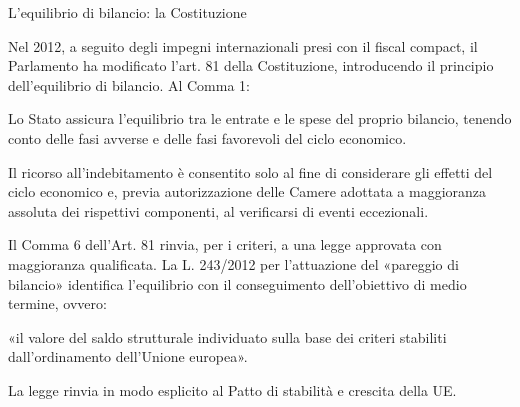 \documentclass[aspectratio=149,11pt,italian]{beamer}
\begin{document}
\begin{frame}{L'equilibrio di bilancio: la Costituzione}
  
  Nel 2012, a seguito degli impegni internazionali presi con il \alert{fiscal
    compact}, il Parlamento ha modificato l'art. 81 della Costituzione,
  introducendo il principio dell'\alert{equilibrio di bilancio}. Al Comma 1:

  \begin{quoting}
    \footnotesize Lo Stato assicura l’equilibrio tra le entrate e le spese del
    proprio bilancio, tenendo conto delle fasi avverse e delle fasi favorevoli
    del ciclo economico.

    Il ricorso all’indebitamento è consentito solo al fine di considerare gli
    effetti del ciclo economico e, previa autorizzazione delle Camere adottata
    a maggioranza assoluta dei rispettivi componenti, al verificarsi di eventi
    eccezionali.
  \end{quoting}

  Il Comma 6 dell'Art. 81 rinvia, per i criteri, a una legge approvata con
  maggioranza qualificata. La L. 243/2012 per l'attuazione del «pareggio di
  bilancio» identifica l'equilibrio con il conseguimento dell'\alert{obiettivo
    di medio termine}, ovvero:

  \begin{quoting}
    \small «il valore del \alert{saldo strutturale} individuato sulla base dei
    criteri stabiliti dall'ordinamento dell'Unione europea».
  \end{quoting}

  La legge rinvia in modo esplicito al \alert{Patto di stabilità e crescita}
  della UE.
\end{frame}
\end{document}

